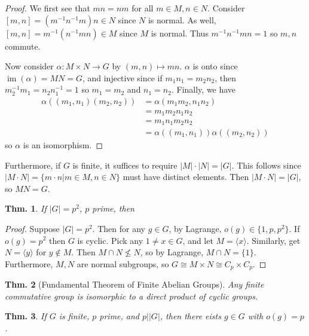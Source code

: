 \documentclass[12pt, a4paper]{book}
\DeclareMathOperator{\im}{im}
\newtheorem{theorem}{Thm.}[section]
\theoremstyle{nonumberplain}
\newtheorem{proof}{Proof}
\begin{document}
\begin{proof}
    We first see that $mn=nm$ for all $m\in M,n\in N$.
    Consider $[m,n]=(m^{-1}n^{-1}m)n\in N$ since $N$ is normal.
    As well, $[m,n]=m^{-1}(n^{-1}mn)\in M$ since $M$ is normal.
    Thus $m^{-1}n^{-1}mn=1$ so $m,n$ commute.

    Now consider $\alpha:M\times N\to G$ by $(m,n)\mapsto mn$.
    $\alpha$ is onto since $\im(\alpha)=MN=G$, and injective since if $m_1n_1=m_2n_2$, then $m_2^{-1}m_1=n_2n_1^{-1}=1$ so $m_1=m_2$ and $n_1=n_2$.
    Finally, we have
    \begin{align*}
        \alpha((m_1,n_1)(m_2,n_2)) &= \alpha(m_1m_2,n_1n_2)\\
                                   &= m_1m_2n_1n_2\\
                                   &= m_1n_1m_2n_2\\
                                   &= \alpha((m_1,n_1))\alpha((m_2,n_2))
    \end{align*}
    so $\alpha$ is an isomorphism.
\end{proof}
Furthermore, if $G$ is finite, it suffices to require $|M|\cdot|N|=|G|$.
This follows since $|M\cdot N|=\{m\cdot n|m\in M,n\in N\}$ must have distinct elements.
Then $|M\cdot N|=|G|$, so $MN=G$.
\begin{theorem}
    If $|G|=p^2$, $p$ prime, then
\end{theorem}
\begin{proof}
    Suppose $|G|=p^2$.
    Then for any $g\in G$, by Lagrange, $o(g)\in\{1,p,p^2\}$.
    If $o(g)=p^2$ then $G$ is cyclic.
    Pick any $1\neq x\in G$, and let $M=\langle x\rangle$.
    Similarly, get $N=\langle y\rangle$ for $y\notin M$.
    Then $M\cap N\not\leq N$, so by Lagrange, $M\cap N=\{1\}$.
    Furthermore, $M,N$ are normal subgroups, so $G\cong M\times N\cong C_p\times C_p$.
\end{proof}
\begin{theorem}[Fundamental Theorem of Finite Abelian Groups]
    Any finite commutative group is isomorphic to a direct product of cyclic groups.
\end{theorem}
\begin{theorem}
    If $G$ is finite, $p$ prime, and $p||G|$, then there eists $g\in G$ with $o(g)=p$.
\end{theorem}
\end{document}
